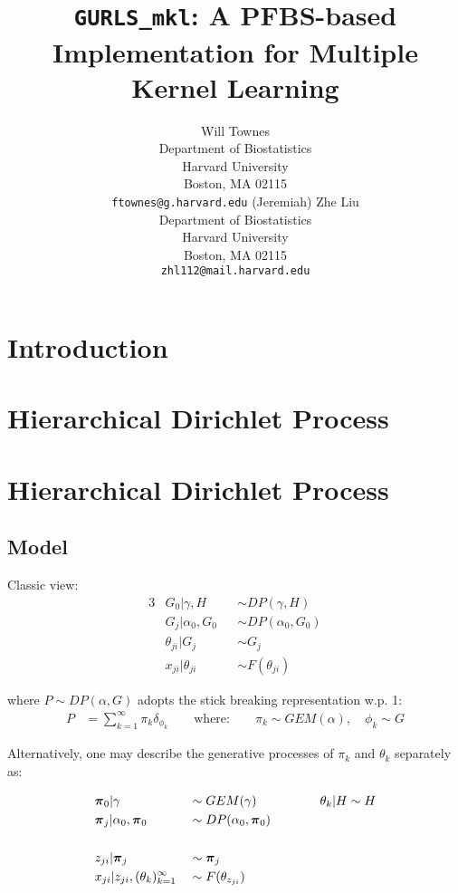 \documentclass{article} %
\title{{\tt GURLS\_mkl}: A PFBS-based Implementation for Multiple Kernel Learning}
\author{
Will Townes \\
Department of Biostatistics\\
Harvard University\\
Boston, MA 02115 \\
\texttt{ftownes@g.harvard.edu} 
\And
(Jeremiah) Zhe Liu \\
Department of Biostatistics\\
Harvard University\\
Boston, MA 02115 \\
\texttt{zhl112@mail.harvard.edu} 
}
\begin{document}
\maketitle
\vspace*{-4em}
\tableofcontents
\thispagestyle{empty}
\newpage
\setcounter{page}{1}




\section{Introduction}

\section{Hierarchical Dirichlet Process}


\appendix
\section{Hierarchical Dirichlet Process}

\subsection{Model}

Classic view:
\begin{alignat*}{3}
& G_0 | \gamma, H && \sim DP(\gamma, H) \\
& G_j | \alpha_0, G_0 && \sim DP(\alpha_0, G_0) \\
& \theta_{ji} | G_j && \sim G_j \\
& x_{ji} | \theta_{ji} && \sim F(\theta_{ji})
\end{alignat*}

where $P \sim DP(\alpha, G)$ adopts the stick breaking representation w.p. 1:
\begin{align*}
P &= \sum_{k=1}^\infty \pi_k \delta_{\phi_k} \qquad \mbox{where:} 
\qquad
\pi_k \sim GEM(\alpha), \quad \phi_k  \sim G
\end{align*}

Alternatively, one may describe the generative processes of $\pi_k$ and $\theta_k$ separately as:

\begin{alignat*}{3}
& \boldsymbol{\pi}_0 | \gamma && \sim GEM(\gamma) 
\qquad\qquad && \theta_k | H \sim H 
\\
& \boldsymbol{\pi}_j | \alpha_0, \boldsymbol{\pi}_0 && \sim DP(\alpha_0, \boldsymbol{\pi}_0) \\ \\
& z_{ji} | \boldsymbol{\pi}_j && \sim \boldsymbol{\pi}_j \\
& 
x_{ji} | z_{ji}, (\theta_{k})_{k=1}^\infty && \sim F(\theta_{z_{ji}})
\end{alignat*}
\end{document}
